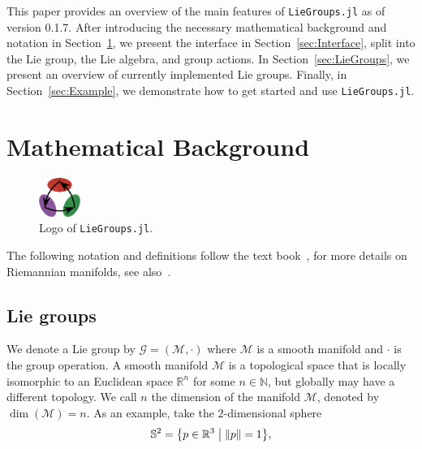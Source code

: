 \documentclass{juliacon}
\newcommand{\LieGroupsVersion}{0.1.7}
\begin{document}
This paper provides an overview of the main features of \verb|LieGroups.jl| as of version \LieGroupsVersion{}.
After introducing the necessary mathematical background and notation in Section~\ref{sec:Notation},
we present the interface in Section~\ref{sec:Interface}, split into the Lie group, the Lie algebra, and group actions.
In Section~\ref{sec:LieGroups}, we present an overview of currently implemented Lie groups.
Finally, in Section~\ref{sec:Example}, we demonstrate how to get started and use \verb|LieGroups.jl|.

\section{Mathematical Background}%
\label{sec:Notation}

\begin{figure}[tbp]
    \centering
    \includegraphics[width=0.12\textwidth]{logo.png}
    \vspace{.5\baselineskip}
    \caption*{Logo of \texttt{LieGroups.jl}.}%
    \label{fig:liegroups_logo}
\end{figure}

The following notation and definitions follow the text book~\cite{HilgertNeeb:2012},
for more details on Riemannian manifolds, see also~\cite{DoCarmo:1992}.

\subsection{Lie groups}
We denote a Lie group by \(\mathcal{G} = (\mathcal{M}, \cdot)\) where \(\mathcal{M}\) is a smooth manifold and \(\cdot\) is the group operation.
A smooth manifold \(\mathcal{M}\) is a topological space that is locally isomorphic to an Euclidean space \(\mathbb{R}^n\) for some \(n \in \mathbb{N}\), but globally may have a different topology.
We call \(n\) the dimension of the manifold \(\mathcal{M}\), denoted by \(\dim(\mathcal{M}) = n\).
As an example, take the \(2\)-dimensional sphere
\begin{equation*}
\mathbb{S}^2 = \bigl\{ p \in \mathbb{R}^3 \bigm| \lVert p\rVert = 1\bigr\},
\end{equation*}
\end{document}
